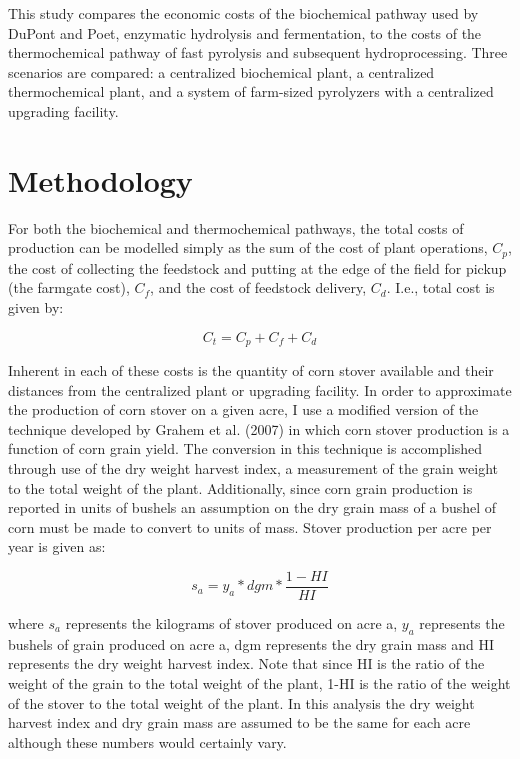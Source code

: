\documentclass{article}\usepackage[]{graphicx}\usepackage[]{color}
\begin{document}
This study compares the economic costs of the biochemical pathway used by DuPont and Poet, enzymatic hydrolysis and fermentation, to the costs of the thermochemical pathway of fast pyrolysis and subsequent hydroprocessing.  Three scenarios are compared: a centralized biochemical plant, a centralized thermochemical plant, and a system of farm-sized pyrolyzers with a centralized upgrading facility.

\section{Methodology}

For both the biochemical and thermochemical pathways, the total costs of production can be modelled simply as the sum of the cost of plant operations, $C_p$, the cost of collecting the feedstock and putting at the edge of the field for pickup (the farmgate cost), $C_f$, and the cost of feedstock delivery, $C_d$.  I.e., total cost is given by:

\begin{equation} \tag{1}
C_t = C_p + C_f + C_d
\end{equation}

Inherent in each of these costs is the quantity of corn stover available and their distances from the centralized plant or upgrading facility. In order to approximate the production of corn stover on a given acre, I use a modified version of the technique developed by Grahem et al. (2007) \cite{Graham et al} in which corn stover production is a function of corn grain yield.  The conversion in this technique is accomplished through use of the dry weight harvest index, a measurement of the grain weight to the total weight of the plant.  Additionally, since corn grain production is reported in units of bushels an assumption on the dry grain mass of a bushel of corn must be made to convert to units of mass.  Stover production per acre per year is given as:

\begin{equation} \tag{2}
s_a = y_a * dgm * \frac{1-HI}{HI}
\end{equation}

where $s_a$ represents the kilograms of stover produced on acre a, $y_a$ represents the bushels of grain produced on acre a, dgm represents the dry grain mass and HI represents the dry weight harvest index.  Note that since HI is the ratio of the weight of the grain to the total weight of the plant, 1-HI is the ratio of the weight of the stover to the total weight of the plant.  In this analysis the dry weight harvest index and dry grain mass are assumed to be the same for each acre although these numbers would certainly vary.
\end{document}
